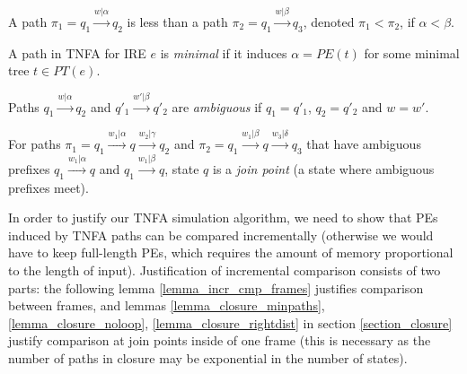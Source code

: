 \documentclass[AMA,STIX1COL]{WileyNJD-v2}
\newcommand{\PT}{PT}
\newcommand{\PE}{P\!E}
\begin{document}
    \begin{definition}
    A path
    $\pi_1 = q_1 \overset {w|\alpha} {\longrightarrow} q_2$ is less than a path
    $\pi_2 = q_1 \overset {w|\beta} {\longrightarrow} q_3$,
    denoted $\pi_1 < \pi_2$, if $\alpha < \beta$.
    \end{definition}

    \begin{definition}
    A path in TNFA for IRE $e$ is \emph{minimal} if it induces
    $\alpha = \PE(t)$ for some minimal tree $t \in \PT(e)$.
    \end{definition}

    \begin{definition}
    Paths
    $q_1 \overset {w|\alpha} {\longrightarrow} q_2$ and
    $q'_1 \overset {w'|\beta} {\longrightarrow} q'_2$
    are \emph{ambiguous}
    if $q_1=q'_1$, $q_2=q'_2$ and $w=w'$.
    \end{definition}

    \begin{definition}
    For paths
    $\pi_1 = q_1 \overset {w_1|\alpha} {\longrightarrow} q \overset {w_2|\gamma} {\longrightarrow} q_2$ and
    $\pi_2 = q_1 \overset {w_1|\beta} {\longrightarrow} q \overset {w_3|\delta} {\longrightarrow} q_3$
    that have ambiguous prefixes $q_1 \overset {w_1|\alpha} {\longrightarrow} q$ and $q_1 \overset {w_1|\beta} {\longrightarrow} q$,
    state $q$ is a \emph{join point} (a state where ambiguous prefixes meet).
    \end{definition}

In order to justify our TNFA simulation algorithm,
we need to show that PEs induced by TNFA paths can be compared incrementally
(otherwise we would have to keep full-length PEs, which requires the amount of memory proportional to the length of input).
Justification of incremental comparison consists of two parts:
the following lemma \ref{lemma_incr_cmp_frames} justifies comparison between frames,
and lemmas \ref{lemma_closure_minpaths}, \ref{lemma_closure_noloop}, \ref{lemma_closure_rightdist}
in section \ref{section_closure} justify comparison at join points inside of one frame
(this is necessary as the number of paths in closure may be exponential in the number of states).
\end{document}
